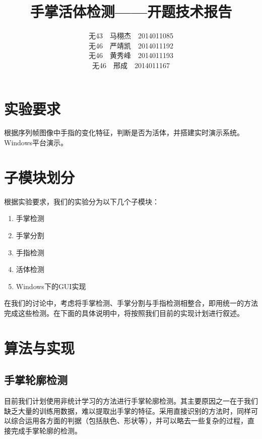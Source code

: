 \documentclass[UTF8]{ctexart}
\begin{document}
\title{手掌活体检测——开题技术报告}
\author{无43\ \ 马栩杰\ \ 2014011085\\ 无46\ \ 严靖凯\ \ 2014011192\\ 无46\ \ 黄秀峰\ \ 2014011193\\ 无46\ \ 邢成\ \ 2014011167}
\maketitle

\section{实验要求}

	根据序列帧图像中手指的变化特征，判断是否为活体，并搭建实时演示系统。Windows平台演示。

\section{子模块划分}

	根据实验要求，我们的实验分为以下几个子模块：

	\begin{enumerate}
		\item 手掌检测
		\item 手掌分割
		\item 手指检测
		\item 活体检测
		\item Windows下的GUI实现
	\end{enumerate}

	在我们的讨论中，考虑将手掌检测、手掌分割与手指检测相整合，即用统一的方法完成这些检测。在下面的具体说明中，将按照我们目前的实现计划进行叙述。

\section{算法与实现}

	\subsection{手掌轮廓检测}

    目前我们计划使用非统计学习的方法进行手掌轮廓检测。其主要原因之一在于我们缺乏大量的训练用数据，难以提取出手掌的特征。采用直接识别的方法时，同样可以综合运用各方面的判据（包括肤色、形状等），并可以略去一些复杂的过程，直接完成手掌轮廓的检测。
    
\end{document}

